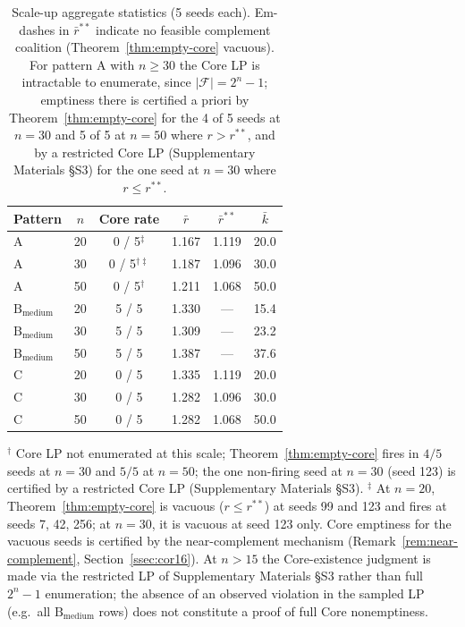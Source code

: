 \documentclass[11pt]{article}
\theoremstyle{plain}
\theoremstyle{definition}
\theoremstyle{remark}
\newcommand{\F}{\mathcal{F}}
\begin{document}
\begin{table}[t]
\centering
\caption{Scale-up aggregate statistics (5 seeds each). Em-dashes in $\bar r^{\ast\ast}$ indicate no feasible complement coalition (Theorem~\ref{thm:empty-core} vacuous). For pattern A with $n\ge 30$ the Core LP is intractable to enumerate, since $|\F|=2^n-1$; emptiness there is certified a priori by Theorem~\ref{thm:empty-core} for the 4 of 5 seeds at $n=30$ and 5 of 5 at $n=50$ where $r>r^{\ast\ast}$, and by a restricted Core LP (Supplementary Materials \S S3) for the one seed at $n=30$ where $r\le r^{\ast\ast}$.}
\label{tab:scaleup}
\small
\begin{tabular}{@{}lccccc@{}}
\toprule
Pattern & $n$ & Core rate & $\bar r$ & $\bar r^{\ast\ast}$ & $\bar k$ \\
\midrule
A                          & 20 & 0 / 5$^{\ddagger}$       & 1.167 & 1.119 & 20.0 \\
A                          & 30 & 0 / 5$^{\dagger\ddagger}$ & 1.187 & 1.096 & 30.0 \\
A                          & 50 & 0 / 5$^{\dagger}$         & 1.211 & 1.068 & 50.0 \\
\midrule
$\text{B}_{\text{medium}}$ & 20 & 5 / 5 & 1.330 & --- & 15.4 \\
$\text{B}_{\text{medium}}$ & 30 & 5 / 5 & 1.309 & --- & 23.2 \\
$\text{B}_{\text{medium}}$ & 50 & 5 / 5 & 1.387 & --- & 37.6 \\
\midrule
C                          & 20 & 0 / 5 & 1.335 & 1.119 & 20.0 \\
C                          & 30 & 0 / 5 & 1.282 & 1.096 & 30.0 \\
C                          & 50 & 0 / 5 & 1.282 & 1.068 & 50.0 \\
\bottomrule
\end{tabular}

{\footnotesize $^{\dagger}$ Core LP not enumerated at this scale; Theorem~\ref{thm:empty-core} fires in $4/5$ seeds at $n=30$ and $5/5$ at $n=50$; the one non-firing seed at $n=30$ (seed 123) is certified by a restricted Core LP (Supplementary Materials \S S3). $^{\ddagger}$ At $n=20$, Theorem~\ref{thm:empty-core} is vacuous ($r\le r^{\ast\ast}$) at seeds 99 and 123 and fires at seeds 7, 42, 256; at $n=30$, it is vacuous at seed 123 only. Core emptiness for the vacuous seeds is certified by the near-complement mechanism (Remark~\ref{rem:near-complement}, Section~\ref{ssec:cor16}). At $n>15$ the Core-existence judgment is made via the restricted LP of Supplementary Materials \S S3 rather than full $2^n-1$ enumeration; the absence of an observed violation in the sampled LP (e.g.\ all $\text{B}_{\text{medium}}$ rows) does not constitute a proof of full Core nonemptiness.}
\end{table}
\end{document}
